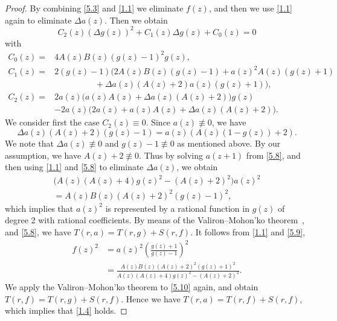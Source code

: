 \documentclass{amsart}
\begin{document}
\begin{proof}
By combining \eqref{5.3} and \eqref{1.1} we eliminate $f(z)$, and then we use \eqref{1.1} again to eliminate $\Delta a(z)$. Then we obtain
\begin{equation}
C_2(z)(\Delta g(z))^2+C_1(z)\Delta g(z)+C_0(z)=0\label{5.4}
 \end{equation}
with
\begin{align}
C_0(z)=&4A(z)B(z)(g(z)-1)^2g(z),\label{5.5}\\
C_1(z)=&2(g(z)-1)\big(2A(z)B(z)(g(z)-1)+a(z)^2A(z)(g(z)+1)\nonumber\\
&\hspace{2cm}+\Delta a(z)(A(z)+2)a(z)(g(z)+1)\big),\label{5.6}\\
C_2(z)=&2a(z)\big(a(z)A(z)+\Delta a(z)(A(z)+2)\big)g(z)\nonumber\\
&-2a(z)\big(2a(z)+a(z)A(z)+\Delta a(z)(A(z)+2)\big).\label{5.7}
\end{align}
We consider first the case $C_2(z)\equiv0$. Since $a(z)\not\equiv0$, we have
\begin{equation}
 \Delta a(z)(A(z)+2)(g(z)-1)=a(z)(A(z)(1-g(z))+2). \label{5.8}
  \end{equation}
We note that $\Delta a(z)\not\equiv0$ and $g(z)-1\not\equiv0$ as mentioned above.
By our assumption, we have $A(z)+2\not\equiv0$.
Thus by solving $a(z+1)$ from \eqref{5.8}, and then using \eqref{1.1} and \eqref{5.8} to eliminate $\Delta a(z)$, we obtain
\begin{multline}
\big(A(z)(A(z)+4)g(z)^2-(A(z)+2)^2\big)a(z)^2\\
=A(z)B(z)(A(z)+2)^2(g(z)-1)^2,\label{5.9}
 \end{multline}
which implies that $a(z)^2$ is represented by a rational function in $g(z)$ of degree 2
with rational coefficients. By means of the Valiron--Mohon'ko theorem~\cite{mohonko:71},~\cite[Theorem~2.2.5]{laine:93} and \eqref{5.8}, we have $T(r,a)=T(r,g)+S(r,f)$.
It follows from \eqref{1.1} and \eqref{5.9},
\begin{align}
f(z)^2&=a(z)^2\left(\frac{g(z)+1}{g(z)-1}\right)^2\nonumber\\
&=\frac{A(z)B(z)(A(z)+2)^2(g(z)+1)^2}{A(z)(A(z)+4)g(z)^2-(A(z)+2)^2}.\label{5.10}
\end{align}
We apply the Valiron--Mohon'ko theorem to \eqref{5.10} again,
and obtain $T(r,f)=T(r,g)+S(r,f)$. Hence we have $T(r,a)=T(r,f)+S(r,f)$, which implies that \eqref{1.4} holds.


\end{proof}
\end{document}
